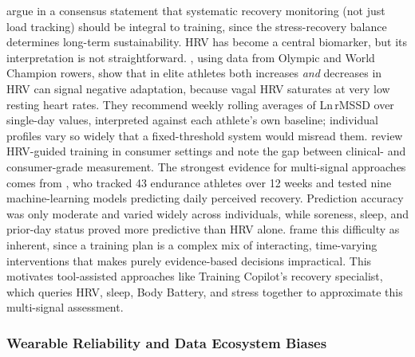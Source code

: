 \cite{kellmann_recovery_2018} argue in a consensus statement that systematic recovery monitoring (not just load tracking) should be integral to training, since the stress-recovery balance determines long-term sustainability. HRV has become a central biomarker, but its interpretation is not straightforward. \cite{plews_training_2013}, using data from Olympic and World Champion rowers, show that in elite athletes both increases \textit{and} decreases in HRV can signal negative adaptation, because vagal HRV saturates at very low resting heart rates. They recommend weekly rolling averages of Ln\,rMSSD over single-day values, interpreted against each athlete's own baseline; individual profiles vary so widely that a fixed-threshold system would misread them. \cite{lundstrom_hrv_2023} review HRV-guided training in consumer settings and note the gap between clinical- and consumer-grade measurement. The strongest evidence for multi-signal approaches comes from \cite{rothschild_predicting_2024}, who tracked 43 endurance athletes over 12 weeks and tested nine machine-learning models predicting daily perceived recovery. Prediction accuracy was only moderate and varied widely across individuals, while soreness, sleep, and prior-day status proved more predictive than HRV alone. \cite{wackerhage_personalized_2021} frame this difficulty as inherent, since a training plan is a complex mix of interacting, time-varying interventions that makes purely evidence-based decisions impractical. This motivates tool-assisted approaches like Training Copilot's recovery specialist, which queries HRV, sleep, Body Battery, and stress together to approximate this multi-signal assessment.

\subsubsection{Wearable Reliability and Data Ecosystem Biases}

